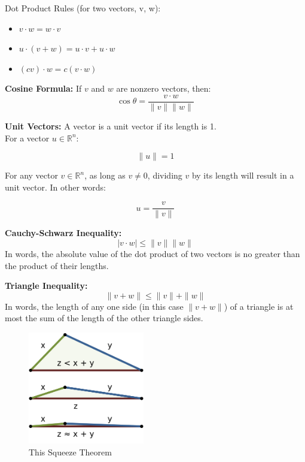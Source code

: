\documentclass[11pt]{article}
\begin{document}
Dot Product Rules (for two vectors, v, w):
\begin{itemize}
    \item $ v \cdot w = w \cdot v $
    \item $ u \cdot (v + w) = u \cdot v + u \cdot w $
    \item $ (cv) \cdot w = c(v \cdot w) $
\end{itemize}

\textbf{Cosine Formula:} If $v$ and $w$ are nonzero vectors, then:
\[ \cos \theta = \frac{v \cdot w}{\|v\| \|w\|}\]

\textbf{Unit Vectors:} A vector is a unit vector if its length is 1. \\
For a vector $u \in \mathbb{R}^n$:

\[ \|u\| = 1\]

For any vector $v \in \mathbb{R}^n$, as long as $v \ne 0$, dividing $v$ by its length will
result in a unit vector. In other words:

\[ u = \frac{v}{\|v\|} \]

\textbf{Cauchy-Schwarz Inequality:} 
\[ | v \cdot w | \le \|v\|  \|w\| \]
In words, the absolute value of the dot product of two vectors is no greater than the product 
of their lengths.

\textbf{Triangle Inequality:} 
\[\|v + w\| \le \|v\| + \|w\|\]
In words, the length of any one side (in this case $\|v+w\|$) of a triangle is at most the sum
of the length of the other triangle sides.

\begin{figure}[H] 
	\centering 
	\includegraphics[width=2in]{imgs/triangle_inequality.png}
	\caption{This Squeeze Theorem}
\end{figure}
\end{document}
